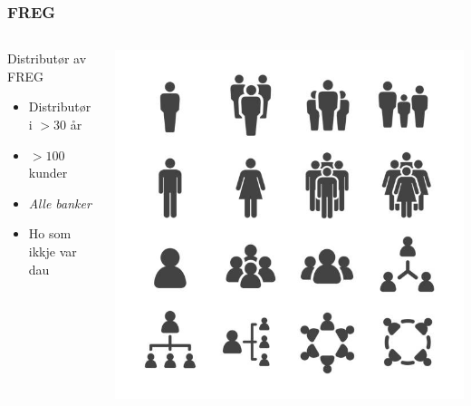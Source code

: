 \documentclass{beamer}
\begin{document}
    \begin{frame}
        \frametitle{FREG }
        \begin{columns}[c]
            \begin{column}{.55\textwidth}
                \begin{block}{Distributør av FREG}
                    \begin{itemize}
                        \item Distributør i $> 30$ år
                        \item $> 100$ kunder
                        \item \emph{Alle banker}
                        \item Ho som ikkje var dau
                    \end{itemize}
                \end{block}
            \end{column}
            \begin{column}{.45\textwidth}
                \begin{center}
                    \includegraphics[width=\textwidth]{images/freg-bilde}
                \end{center}
            \end{column}
        \end{columns}
    \end{frame}
\end{document}
